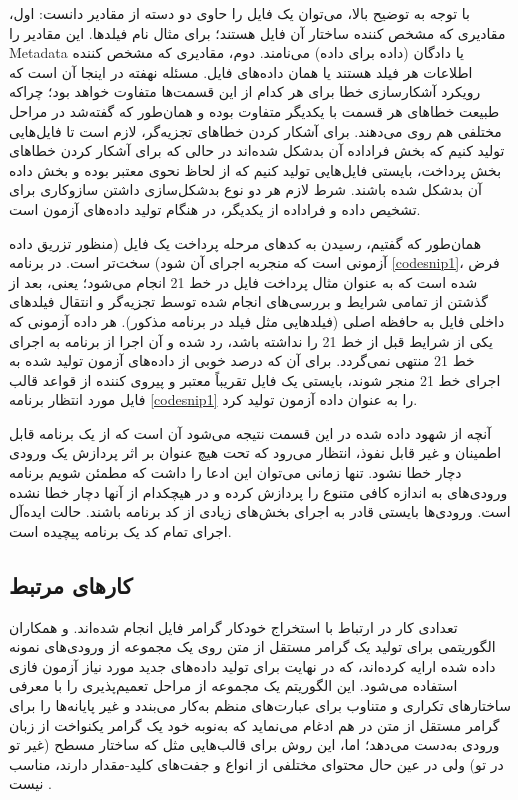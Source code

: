 	
	با توجه به توضیح بالا، می‌توان یک فایل را حاوی دو دسته از مقادیر دانست: اول، مقادیری که مشخص کننده ساختار آن فایل هستند؛ برای مثال نام فیلد‌ها. این مقادیر را \gls{Metadata} یا دادگان (داده برای داده) می‌نامند. دوم، مقادیری که مشخص کننده اطلاعات هر فیلد هستند یا همان داده‌های فایل. مسئله نهفته در اینجا آن است که رویکرد آشکارسازی خطا برای هر کدام از این قسمت‌ها متفاوت خواهد بود؛ چراکه طبیعت خطاهای هر قسمت با یکدیگر متفاوت بوده و همان‌طور که گفته‌شد در مراحل مختلفی هم روی می‌دهند. برای آشکار کردن خطاهای تجزیه‌گر، لازم است تا فایل‌هایی تولید کنیم که بخش فراداده آن بدشکل شده‌اند در حالی که برای آشکار کردن خطاهای بخش پرداخت، بایستی فایل‌هایی تولید کنیم که از لحاظ نحوی معتبر بوده و بخش داده‌ آن بدشکل شده باشند. شرط لازم هر دو نوع بدشکل‌سازی داشتن سازوکاری برای تشخیص داده و فراداده از یکدیگر، در هنگام تولید داده‌های آزمون است.  
	
	همان‌طور که گفتیم، رسیدن به کدهای مرحله پرداخت یک فایل (منظور تزریق داده آزمونی است که منجربه اجرای آن شود) سخت‌تر است. در برنامه \ref{codesnip1}، فرض شده است که به عنوان مثال پرداخت فایل در خط 21 انجام می‌شود؛ یعنی، بعد از گذشتن از تمامی شرایط و بررسی‌های انجام شده توسط تجزیه‌گر و انتقال فیلد‌های داخلی فایل به حافظه اصلی (فیلدهایی مثل فیلد  در برنامه مذکور). هر داده آزمونی که یکی از شرایط قبل از خط 21 را نداشته باشد، رد شده و آن اجرا از برنامه به اجرای خط 21 منتهی نمی‌گردد. برای آن که درصد خوبی از داده‌های آزمون تولید شده به اجرای خط 21 منجر شوند، بایستی یک فایل تقریباً معتبر و پیروی کننده از قواعد قالب فایل مورد انتظار برنامه \ref{codesnip1} را به عنوان داده آزمون تولید کرد. 
	
	آنچه از شهود داده شده در این قسمت نتیجه می‌شود آن است که از یک برنامه قابل اطمینان و غیر قابل نفوذ، انتظار می‌رود که تحت هیچ عنوان بر اثر پردازش یک ورودی دچار خطا نشود. تنها زمانی می‌توان این ادعا را داشت که مطمئن شویم برنامه ورودی‌های به اندازه کافی متنوع را پردازش کرده و در هیچکدام از آنها دچار خطا نشده است. ورودی‌ها بایستی قادر به اجرای بخش‌های زیادی از کد برنامه باشند. حالت ایده‌آل اجرای تمام کد یک برنامه پیچیده است.  
	
	     


\subsection{کارهای مرتبط}
تعدادی کار در ارتباط با استخراج خودکار گرامر فایل انجام شده‌اند.
و همکاران 
\cite{Bastani:2017:SPI:3140587.3062349}
الگوریتمی برای تولید یک گرامر مستقل از متن روی یک مجموعه از ورودی‌های نمونه داده شده ارایه کرده‌اند، که در نهایت برای تولید داده‌های جدید مورد نیاز آزمون فازی استفاده می‌شود. این الگوریتم یک مجموعه از مراحل تعمیم‌پذیری را با معرفی ساختارهای تکراری و متناوب برای عبارت‌های منظم به‌کار می‌بندد و غیر پایانه‌ها را برای گرامر مستقل از متن در هم ادغام می‌نماید که به‌نوبه خود یک گرامر یکنواخت از زبان ورودی به‌دست می‌دهد؛ اما، این روش برای قالب‌هایی مثل 
 که ساختار مسطح (غیر تو در تو) ولی در عین حال محتوای مختلفی از انواع و جفت‌های کلید-مقدار دارند، مناسب نیست
 \cite{Godefroid:2017:LML:3155562.3155573}.
 
